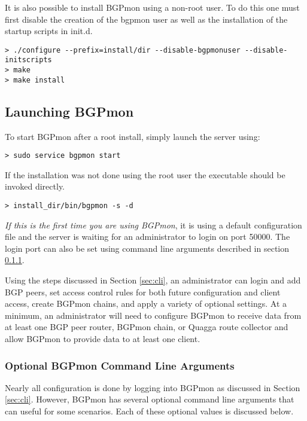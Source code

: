 It is also possible to install BGPmon using a non-root user.
To do this one must first disable the creation of the bgpmon user as well as the installation of the startup scripts in init.d.

\begin{Verbatim}[frame=single]
> ./configure --prefix=install/dir --disable-bgpmonuser --disable-initscripts
> make
> make install
\end{Verbatim}

\subsection{Launching BGPmon}
\label{sec:install:launch}

To start BGPmon after a root install, simply launch the server using:   

\begin{Verbatim}[frame=single]
> sudo service bgpmon start
\end{Verbatim}

If the installation was not done using the root user the executable should be invoked directly.

\begin{Verbatim}[frame=single]
> install_dir/bin/bgpmon -s -d
\end{Verbatim}

\emph{If this is the first time you are using BGPmon}, it is using a default configuration file and the server is waiting for an administrator to login on port 50000.
The login port can also be set using command line arguments described in section \ref{sec:install:cla}.

Using the steps discussed in Section \ref{sec:cli}, an administrator can login and add BGP peers, set access control rules for both future configuration and client access,  create BGPmon chains, and apply a variety of optional settings.
At a minimum,  an administrator will need to configure BGPmon to receive data from at least one BGP peer router, BGPmon chain, or Quagga route collector and allow BGPmon to provide data to at least one client.

\subsubsection{Optional BGPmon Command Line Arguments}
\label{sec:install:cla}

Nearly all configuration is done by logging into BGPmon as discussed in Section \ref{sec:cli}.
However, BGPmon has several optional command line arguments that can useful for some scenarios.
Each of these optional values is discussed below.

